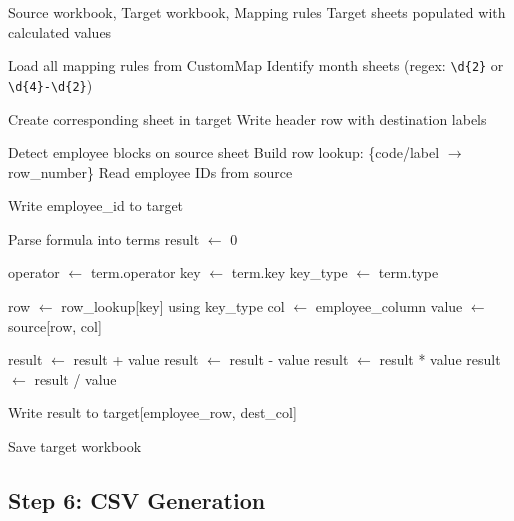 \begin{algorithm}[H]
\caption{Apply Mappings to All Month Sheets}
\begin{algorithmic}[1]
\Require Source workbook, Target workbook, Mapping rules
\Ensure Target sheets populated with calculated values

\State Load all mapping rules from CustomMap
\State Identify month sheets (regex: \texttt{\textbackslash d\{2\}} or \texttt{\textbackslash d\{4\}-\textbackslash d\{2\}})

    \State Create corresponding sheet in target
    \State Write header row with destination labels
    
    \State Detect employee blocks on source sheet
    \State Build row lookup: \{code/label $\rightarrow$ row\_number\}
    \State Read employee IDs from source
    
        \State Write employee\_id to target
        
            \State Parse formula into terms
            \State result $\gets$ 0
            
                \State operator $\gets$ term.operator
                \State key $\gets$ term.key
                \State key\_type $\gets$ term.type
                
                \State row $\gets$ row\_lookup[key] using key\_type
                \State col $\gets$ employee\_column
                \State value $\gets$ source[row, col]
                
                    \State result $\gets$ result + value
                    \State result $\gets$ result - value
                    \State result $\gets$ result * value
                    \State result $\gets$ result / value
                \EndIf
            \EndFor
            
            \State Write result to target[employee\_row, dest\_col]
        \EndFor
    \EndFor
    
    \State Save target workbook
\EndFor
\end{algorithmic}
\end{algorithm}

\subsection{Step 6: CSV Generation}

